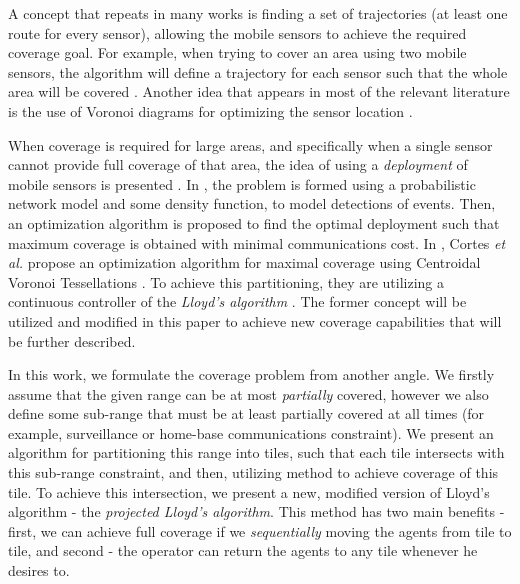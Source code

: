 \documentclass{iacas}
\begin{document}
A concept that repeats in many works is finding a set of trajectories (at least one route for every sensor), allowing the mobile sensors to achieve the required coverage goal.  For example, when trying to cover an area using two mobile sensors, the algorithm will define a trajectory for each sensor such that the whole area will be covered \cite{Atinc2013,Hussein2007}.
Another idea that appears in most of the relevant literature is the use of Voronoi diagrams for optimizing the sensor location \cite{Cortes2004,Hussein2007}. 

When coverage is required for large areas, and specifically when a single sensor cannot provide full coverage of that area, the idea of using a \emph{deployment} of mobile sensors is presented \cite{Cassandras2005, Cortes2004}. In \cite{Li2005}, the problem is formed using a probabilistic network model and some density function, to model detections of events. Then, an optimization algorithm is proposed to find the optimal deployment such that maximum coverage is obtained with minimal communications cost. In \cite{Cortes2004}, Cortes \textit{et al.} propose an optimization algorithm for maximal coverage using Centroidal Voronoi Tessellations \cite{Du1999}. To achieve this partitioning, they are utilizing a continuous controller of the \emph{Lloyd's algorithm} \cite{Lloyd1982}. The former concept will be utilized and modified in this paper to achieve new coverage capabilities that will be further described.

In this work, we formulate the coverage problem from another angle. We firstly assume that the given range can be at most \emph{partially} covered, however we also define some sub-range that must be at least partially covered at all times (for example, surveillance or home-base communications constraint). We present an algorithm for partitioning this range into tiles, such that each tile intersects with this sub-range constraint, and then, utilizing \cite{Cortes2004} method to achieve coverage of this tile. To achieve this intersection, we present a new, modified version of Lloyd's algorithm - the \emph{projected Lloyd's algorithm}. This method has two main benefits - first, we can achieve full coverage if we \emph{sequentially} moving the agents from tile to tile, and second - the operator can return the agents to any tile whenever he desires to.%
\end{document}
